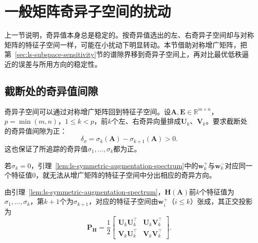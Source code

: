 
\section{一般矩阵奇异子空间的扰动}
\label{sec:ls-singular-subspace-sensitivity}

上一节说明，奇异值本身总是稳定的。按奇异值选出的左、右奇异子空间却与对称矩阵的特征子空间一样，可能在小扰动下明显转动。本节借助对称增广矩阵，把第~\ref{sec:ls-subspace-sensitivity}节的谱隙界移到奇异子空间上，再对比最优低秩逼近的误差与所用方向的稳定性。

\subsection{截断处的奇异值间隙}
奇异子空间可以通过对称增广矩阵回到特征子空间。设$\bm A,\bm E\in\mathbb R^{m\times n}$，$p=\min(m,n)$，$1\leq k<p$，前$k$个左、右奇异向量排成$\bm U_k$、$\bm V_k$。要求截断处的奇异值间隙为正：
\[
 \delta_\sigma=\sigma_k(\bm A)-\sigma_{k+1}(\bm A)>0 .
\]
这也保证了所追踪的奇异值$\sigma_1,\ldots,\sigma_k$都为正。

若$\sigma_k=0$，引理~\ref{lem:ls-symmetric-augmentation-spectrum}中的$\bm w_k^+$与$\bm w_k^-$对应同一个特征值$0$，就无法从增广矩阵的特征子空间中分出相应的奇异方向。

由引理~\ref{lem:ls-symmetric-augmentation-spectrum}，$\bm H(\bm A)$前$k$个特征值为$\sigma_1,\ldots,\sigma_k$，第$k+1$个为$\sigma_{k+1}$，对应的特征子空间由$\bm w_i^+$（$i\leq k$）张成，其正交投影为
\[
 \bm P_{\bm H}=\frac12\begin{bmatrix}\bm U_k\bm U_k^\top&\bm U_k\bm V_k^\top\\\bm V_k\bm U_k^\top&\bm V_k\bm V_k^\top\end{bmatrix}.
\]

